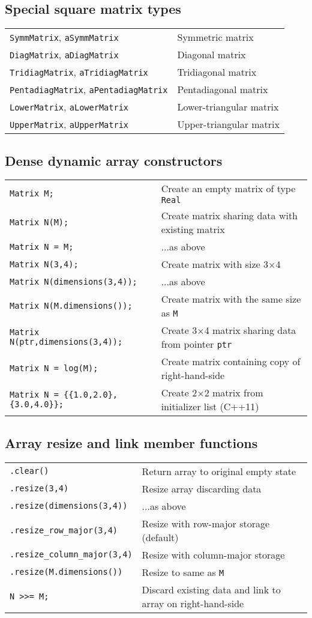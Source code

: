 \documentclass[10pt,a4,landscape]{article}
\def\code#1{\texttt{#1}}
\begin{document}
\subsection*{Special square matrix types}
\begin{tabular}{ll}
\code{SymmMatrix}, \code{aSymmMatrix} & Symmetric matrix\\
\code{DiagMatrix}, \code{aDiagMatrix} & Diagonal matrix\\
\code{TridiagMatrix}, \code{aTridiagMatrix} & Tridiagonal matrix\\
\code{PentadiagMatrix}, \code{aPentadiagMatrix} & Pentadiagonal matrix\\
\code{LowerMatrix}, \code{aLowerMatrix} & Lower-triangular matrix\\
\code{UpperMatrix}, \code{aUpperMatrix} & Upper-triangular matrix\\
\end{tabular}
\subsection*{Dense dynamic array constructors}
\begin{tabular}{ll}
\code{Matrix M;} & Create an empty matrix of type \code{Real}\\
\code{Matrix N(M);} & Create matrix sharing data with existing matrix\\
\code{Matrix N = M;} & ...as above\\
\code{Matrix N(3,4);} & Create matrix with size 3$\times$4\\
\code{Matrix N(dimensions(3,4));} & ...as above\\
\code{Matrix N(M.dimensions());} & Create matrix with the same size as \code{M}\\
\code{Matrix N(ptr,dimensions(3,4));} & Create 3$\times$4 matrix sharing data from pointer \code{ptr}\\
\code{Matrix N = log(M);} & Create matrix containing copy of right-hand-side\\
\code{Matrix N = \{\{1.0,2.0\},\{3.0,4.0\}\};} & Create 2$\times$2 matrix from initializer list (C++11)\\
\end{tabular}
\subsection*{Array resize and link member functions}
\begin{tabular}{ll}
\code{.clear()} & Return array to original empty state\\
\code{.resize(3,4)} & Resize array discarding data\\
\code{.resize(dimensions(3,4))} & ...as above\\
\code{.resize\_row\_major(3,4)} & Resize with row-major storage (default)\\
\code{.resize\_column\_major(3,4)} & Resize with column-major storage\\
\code{.resize(M.dimensions())} & Resize to same as \code{M}\\
\code{N >{}>= M;} & Discard existing data and link to array on right-hand-side\\
\end{tabular}
\end{document}
